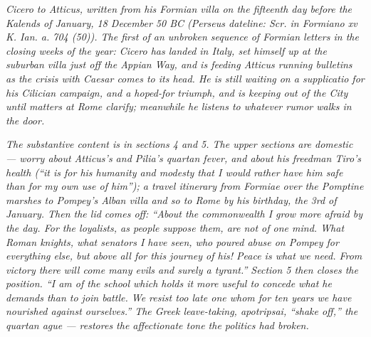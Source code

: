 
\textit{Cicero to Atticus, written from his Formian villa on
the fifteenth day before the Kalends of January, 18 December
50 BC (Perseus dateline:
\textit{Scr. in Formiano xv K. Ian. a. 704 (50)}). The first
of an unbroken sequence of Formian letters in the closing
weeks of the year: Cicero has landed in Italy, set himself up
at the suburban villa just off the Appian Way, and is feeding
Atticus running bulletins as the crisis with Caesar comes to
its head. He is still waiting on a supplicatio for his
Cilician campaign, and a hoped-for triumph, and is keeping
out of the City until matters at Rome clarify; meanwhile he
listens to whatever rumor walks in the door.}

\textit{The substantive content is in sections 4 and 5. The
upper sections are domestic --- worry about Atticus's and
Pilia's quartan fever, and about his freedman Tiro's health
(``it is for his humanity and modesty that I would rather
have him safe than for my own use of him''); a travel
itinerary from Formiae over the Pomptine marshes to Pompey's
Alban villa and so to Rome by his birthday, the 3rd of
January. Then the lid comes off: ``About the commonwealth I
grow more afraid by the day. For the loyalists, as people
suppose them, are not of one mind. What Roman knights, what
senators I have seen, who poured abuse on Pompey for
everything else, but above all for this journey of his!
Peace is what we need. From victory there will come many
evils and surely a tyrant.'' Section 5 then closes the
position. ``I am of the school which holds it more useful
to concede what he demands than to join battle. We resist
too late one whom for ten years we have nourished against
ourselves.'' The Greek leave-taking, \emph{apotripsai},
``shake off,'' the quartan ague --- restores the affectionate
tone the politics had broken.}
